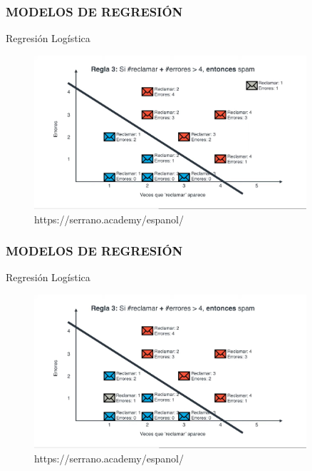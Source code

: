 \documentclass{beamer}
\begin{document}
\begin{frame}
	\frametitle{MODELOS DE REGRESIÓN}
	\begin{block}{Regresión Logística}	
		\begin{figure}
			\includegraphics[width=0.9\textwidth]{Imagenes_reg_log/IMG_3502.jpg}
			\caption{https://serrano.academy/espanol/}
		\end{figure}
	\end{block}
\end{frame}

 \begin{frame}
 	\frametitle{MODELOS DE REGRESIÓN}
 	\begin{block}{Regresión Logística}	
 		\begin{figure}
 			\includegraphics[width=0.9\textwidth]{Imagenes_reg_log/IMG_3503.jpg}
 			\caption{https://serrano.academy/espanol/}
 		\end{figure}
 	\end{block}
 \end{frame}
\end{document}
